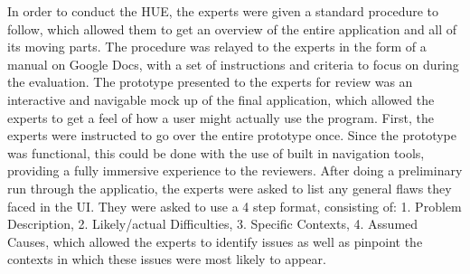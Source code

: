 \documentclass[sigconf]{acmart}
\begin{document}
    In order to conduct the HUE, the experts were given a standard procedure to follow, which allowed them to get an overview of the entire application and all of its moving parts. The procedure was relayed to the experts in the form of a manual on Google Docs, with a set of instructions and criteria to focus on during the evaluation. The prototype presented to the experts for review was an interactive and navigable mock up of the final application, which allowed the experts to get a feel of how a user might actually use the program.
    First, the experts were instructed to go over the entire prototype once. Since the prototype was functional, this could be done with the use of built in navigation tools, providing a fully immersive experience to the reviewers. After doing a preliminary run through the applicatio, the experts were asked to list any general flaws they faced in the UI. They were asked to use a 4 step format, consisting of: 1. Problem Description, 2. Likely/actual Difficulties, 3. Specific Contexts, 4. Assumed Causes, which allowed the experts to identify issues as well as pinpoint the contexts in which these issues were most likely to appear. 









\end{document}
